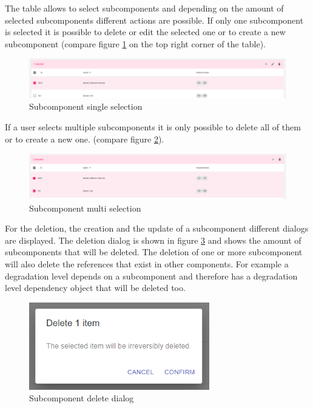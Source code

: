 The table allows to select subcomponents and depending on the amount of selected subcomponents different actions are possible. If only one subcomponent is selected it is possible to delete or edit the selected one or to create a new subcomponent (compare figure \ref{fig:subcomponent_view_single} on the top right corner of the table).

\begin{figure}[ht]
    \centering
    \includegraphics[width=\textwidth]{img/subcomponents_single_select.png}
    \caption{Subcomponent single selection}
    \label{fig:subcomponent_view_single}
\end{figure}

If a user selects multiple subcomponents it is only possible to delete all of them or to create a new one. (compare figure \ref{fig:subcomponent_view_multi}).

\begin{figure}[ht]
    \centering
    \includegraphics[width=\textwidth]{img/subcomponents_multi_select.png}
    \caption{Subcomponent multi selection}
    \label{fig:subcomponent_view_multi}
\end{figure}

For the deletion, the creation and the update of a subcomponent different dialogs are displayed.
The deletion dialog is shown in figure \ref{fig:subcomponent_delete_dialog} and shows the amount of subcomponents that will be deleted. The deletion of one or more subcomponent will also delete the references that exist in other components. For example a degradation level depends on a subcomponent and therefore has a degradation level dependency object that will be deleted too.

\begin{figure}[ht]
    \centering
    \includegraphics[width=0.7\textwidth]{img/subcomponents_delete.png}
    \caption{Subcomponent delete dialog}
    \label{fig:subcomponent_delete_dialog}
\end{figure}

